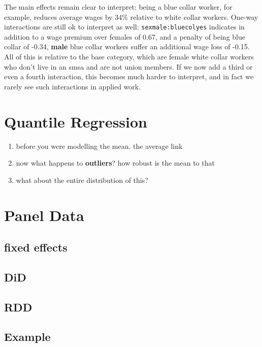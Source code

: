 \documentclass[]{book}
\providecommand{\tightlist}{%
  \setlength{\itemsep}{0pt}\setlength{\parskip}{0pt}}
\theoremstyle{definition}
\theoremstyle{definition}
\theoremstyle{definition}
\theoremstyle{remark}
\begin{document}
The main effects remain clear to interpret: being a blue collar worker,
for example, reduces average wages by 34\% relative to white collar
workers. One-way interactions are still ok to interpret as well:
\texttt{sexmale:bluecolyes} indicates in addition to a wage premium over
females of 0.67, and a penalty of being blue collar of -0.34,
\textbf{male} blue collar workers suffer an additional wage loss of
-0.15. All of this is relative to the base category, which are female
white collar workers who don't live in an smsa and are not union
members. If we now add a third or even a fourth interaction, this
becomes much harder to interpret, and in fact we rarely see such
interactions in applied work.

\chapter{Quantile Regression}\label{quantreg}

\begin{enumerate}
\def\labelenumi{\arabic{enumi}.}
\tightlist
\item
  before you were modelling the mean. the average link
\item
  now what happens to \textbf{outliers}? how robust is the mean to that
\item
  what about the entire distribution of this?
\end{enumerate}

\chapter{Panel Data}\label{panel-data}

\section{fixed effects}\label{fixed-effects}

\section{DiD}\label{did}

\section{RDD}\label{rdd}

\section{Example}\label{example}
\end{document}
